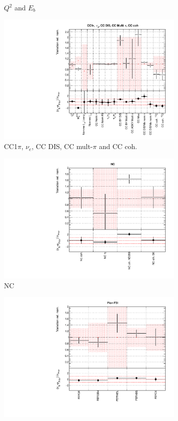 \begin{figure}
\begin{subfigure}{0.49\textwidth}
  \caption{$Q^2$ and $E_b$}
  \label{fig:}
\end{subfigure}
\begin{subfigure}{0.49\textwidth}
  \centering
  \includegraphics[width=0.95\linewidth]{figs/datxsec3}
  \caption{CC1$\pi$, $\nu_e$, CC DIS, CC mult-$\pi$ and CC coh.}
  \label{fig:}
\end{subfigure}
\begin{subfigure}{0.49\textwidth}
  \centering
  \includegraphics[width=0.95\linewidth]{figs/datxsec4}
  \caption{NC}
  \label{fig:}
\end{subfigure}
\begin{subfigure}{0.49\textwidth}
  \centering
  \includegraphics[width=0.95\linewidth]{figs/datxsec5}

\end{subfigure}
\end{figure}
